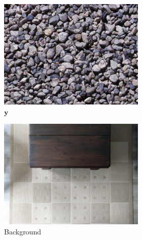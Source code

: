 \begin{figure}[]
\begin{subfigure}{\textwidth}
        \begin{subfigure}{0.24\textwidth}
            \centering
            \includegraphics[width=\textwidth]{images/04-experiment02/carpet/pebbles/target.jpg}
            \caption*{\(\bm{y}\)}
        \end{subfigure}
        \hfill
        \begin{subfigure}{0.24\textwidth}
            \centering
            \includegraphics[width=\textwidth]{images/04-experiment02/carpet/bg.jpg}
            \caption*{Background}
        \end{subfigure}
        \hfill
        \begin{subfigure}{0.24\textwidth}
            \centering
            \begin{tikzpicture}

\end{tikzpicture}
\end{subfigure}
\end{subfigure}
\end{figure}
